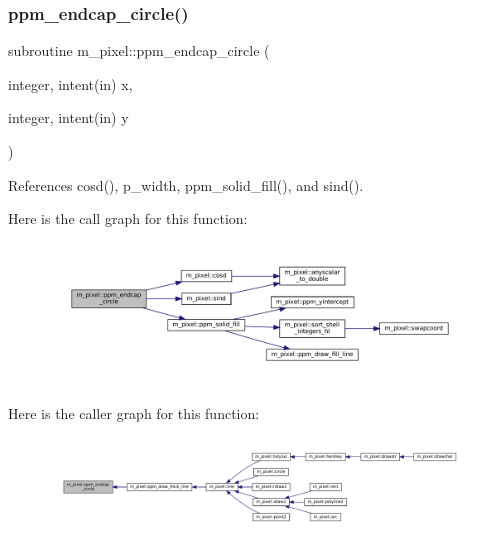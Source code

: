 \subsubsection{\texorpdfstring{ppm\+\_\+endcap\+\_\+circle()}{ppm\_endcap\_circle()}}
{\footnotesize\ttfamily subroutine m\+\_\+pixel\+::ppm\+\_\+endcap\+\_\+circle (\begin{DoxyParamCaption}\item[{integer, intent(in)}]{x,  }\item[{integer, intent(in)}]{y }\end{DoxyParamCaption})\hspace{0.3cm}{\ttfamily [private]}}



References cosd(), p\+\_\+width, ppm\+\_\+solid\+\_\+fill(), and sind().

Here is the call graph for this function\+:
\nopagebreak
\begin{figure}[H]
\begin{center}
\leavevmode
\includegraphics[width=350pt]{namespacem__pixel_aede24c612504a3e416840e6242c2d8fb_cgraph}
\end{center}
\end{figure}
Here is the caller graph for this function\+:
\nopagebreak
\begin{figure}[H]
\begin{center}
\leavevmode
\includegraphics[width=350pt]{namespacem__pixel_aede24c612504a3e416840e6242c2d8fb_icgraph}
\end{center}
\end{figure}
\mbox{\label{namespacem__pixel_aedaf33a27e9899da22c2497aff2af903}} 
